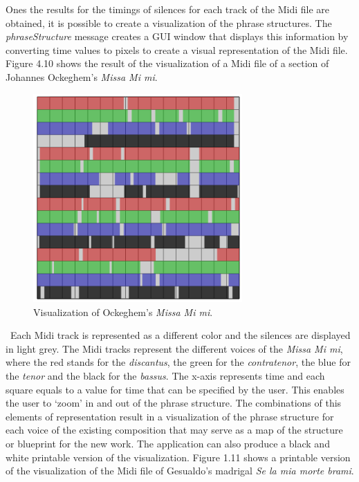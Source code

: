 Ones the results for the timings of silences for each track of the Midi file are obtained, it is possible to create a visualization of the phrase structures. The \emph{phraseStructure} message creates a GUI window that displays this information by converting time values to pixels to create a visual representation of the Midi file. Figure 4.10 shows the result of the visualization of a Midi file of a section of Johannes Ockeghem's \emph{Missa Mi mi}. 
\begin{figure}[htbp] %
   \centering
   \includegraphics[width=8cm]{Chapter6/midi_phrase.tif} %
   \caption{Visualization of Ockeghem's \emph{Missa Mi mi}.}
   \label{fig:example}
\end{figure}\
Each Midi track is represented as a different color and the silences are displayed in light grey. The Midi tracks represent the different voices of the \emph{Missa Mi mi}, where the red stands for the \emph{discantus}, the green for the \emph{contratenor}, the blue for the \emph{tenor} and the black for the \emph{bassus}. The x-axis represents time and each square equals to a value for time that can be specified by the user. This enables the user to `zoom' in and out of the phrase structure. The combinations of this elements of representation result in a visualization of the phrase structure for each voice of the existing composition that may serve as a map of the structure or blueprint for the new work. The application can also produce a black and white printable version of the visualization. Figure 1.11 shows a printable version of the visualization of the Midi file of Gesualdo's madrigal \emph{Se la mia morte brami}. 
